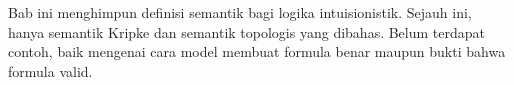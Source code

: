 \documentclass[../../../include/open-logic-chapter]{subfiles}
\begin{document}

\begin{editorial}
  Bab ini menghimpun definisi semantik bagi logika intuisionistik. Sejauh ini,
  hanya semantik Kripke dan semantik topologis yang dibahas. Belum terdapat
  contoh, baik mengenai cara model membuat formula benar maupun bukti bahwa
  formula valid.
\end{editorial}


\OLEndChapterHook
\end{document}
